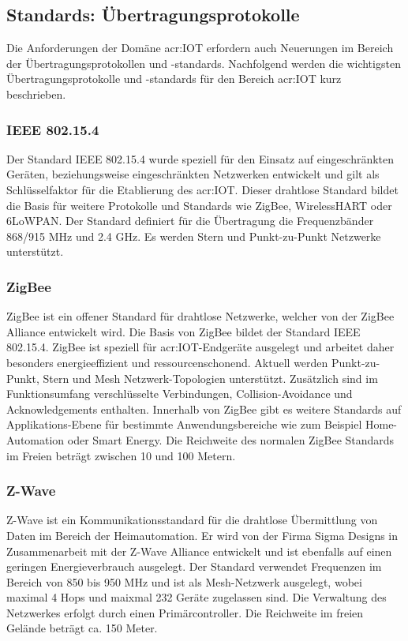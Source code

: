 \subsection{Standards: Übertragungsprotokolle}
Die Anforderungen der Domäne \gls{acr:IOT} erfordern auch Neuerungen im Bereich der Übertragungsprotokollen und -standards. Nachfolgend werden die wichtigsten Übertragungsprotokolle und -standards für den Bereich \gls{acr:IOT} kurz beschrieben.


\subsubsection{IEEE 802.15.4}
Der Standard IEEE 802.15.4 wurde speziell für den Einsatz auf eingeschränkten Geräten, beziehungsweise eingeschränkten Netzwerken entwickelt und gilt als Schlüsselfaktor für die Etablierung des \gls{acr:IOT}. Dieser drahtlose Standard bildet die Basis für weitere Protokolle und Standards wie ZigBee, WirelessHART oder 6LoWPAN. Der Standard definiert für die Übertragung die Frequenzbänder 868/915 MHz und 2.4 GHz. Es werden Stern und Punkt-zu-Punkt Netzwerke unterstützt.


\subsubsection{ZigBee}
ZigBee ist ein offener Standard für drahtlose Netzwerke, welcher von der ZigBee Alliance entwickelt wird. Die Basis von ZigBee bildet der Standard IEEE 802.15.4. ZigBee ist speziell für \gls{acr:IOT}-Endgeräte ausgelegt und arbeitet daher besonders energieeffizient und ressourcenschonend. Aktuell werden Punkt-zu-Punkt, Stern und Mesh Netzwerk-Topologien unterstützt. Zusätzlich  sind im Funktionsumfang verschlüsselte Verbindungen, Collision-Avoidance und Acknowledgements enthalten. Innerhalb von ZigBee gibt es weitere Standards auf Applikations-Ebene für bestimmte Anwendungsbereiche wie zum Beispiel Home-Automation oder Smart Energy. Die Reichweite des normalen ZigBee Standards im Freien beträgt zwischen 10 und 100 Metern.


\subsubsection{Z-Wave}
Z-Wave ist ein Kommunikationsstandard für die drahtlose Übermittlung von Daten im Bereich der Heimautomation. Er wird von der Firma Sigma Designs in Zusammenarbeit mit der Z-Wave Alliance entwickelt und ist ebenfalls auf einen geringen Energieverbrauch ausgelegt. Der Standard verwendet Frequenzen im Bereich von 850 bis 950 MHz und ist als Mesh-Netzwerk ausgelegt, wobei maximal 4 Hops und maixmal 232 Geräte zugelassen sind. Die Verwaltung des Netzwerkes erfolgt durch einen Primärcontroller. Die Reichweite im freien Gelände beträgt ca. 150 Meter. 

